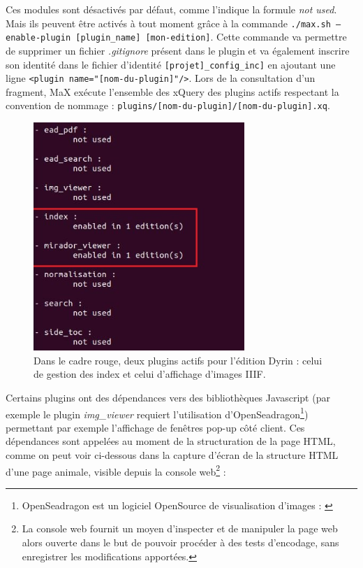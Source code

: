 \documentclass[a4paper,12pt,twoside]{book}
\begin{document}
Ces modules sont désactivés par défaut, comme l'indique la formule \textit{not used}. Mais ils peuvent être activés à tout moment grâce à la commande \texttt{./max.sh --enable-plugin [plugin\_name] [mon-edition]}. Cette commande va permettre de supprimer un fichier\textit{ .gitignore} présent dans le plugin et va également inscrire son identité dans le fichier d'identité \texttt{[projet]\_config\_inc]} en ajoutant une ligne \texttt{<plugin name="[nom-du-plugin]"/>}. Lors de la consultation d'un fragment, MaX exécute l'ensemble des xQuery des plugins actifs respectant la convention de nommage : \texttt{plugins/[nom-du-plugin]/[nom-du-plugin].xq}. 

\begin{figure}[H]
    \centering
    \includegraphics[width=8cm]{img/partie_2/plugins_actifs.JPG}
    \caption{Dans le cadre rouge, deux plugins actifs pour l'édition Dyrin : celui de gestion des index et celui d'affichage d'images \acrshort{IIIF}.}
\end{figure}

Certains plugins ont des dépendances vers des bibliothèques Javascript (par exemple le plugin \textit{img\_viewer} requiert l'utilisation d'OpenSeadragon\footnote{OpenSeadragon est un logiciel OpenSource de visualisation d'images : \cite{openseadragon}}) permettant par exemple l'affichage de fenêtres pop-up côté client. Ces dépendances sont appelées au moment de la structuration de la page \acrshort{HTML}, comme on peut voir ci-dessous dans la capture d'écran de la structure HTML d'une page animale, visible depuis la console web\footnote{La console web fournit un moyen d'inspecter et de manipuler la page web alors ouverte dans le but de pouvoir procéder à des tests d'encodage, sans enregistrer les modifications apportées.} :
\end{document}
